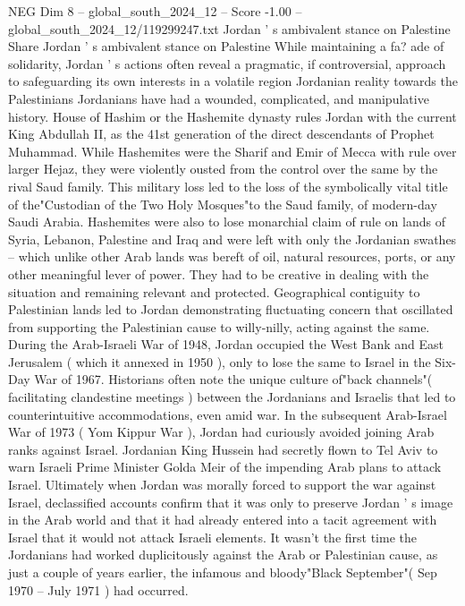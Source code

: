\begin{textsample}{NEG Dim 8 – global\_south\_2024\_12 – Score -1.00 – global\_south\_2024\_12/119299247.txt}  \label{ex:f8_neg_102}
Jordan ' s ambivalent stance on Palestine Share Jordan ' s ambivalent stance on Palestine While maintaining a fa? ade of solidarity, Jordan ' s actions often reveal a pragmatic, if controversial, approach to safeguarding its own interests in a volatile region Jordanian reality towards the Palestinians Jordanians have had a wounded, complicated, and manipulative history.
House of Hashim or the Hashemite dynasty rules Jordan with the current King Abdullah II, as the 41st generation of the direct descendants of Prophet Muhammad.
While Hashemites were the Sharif and Emir of Mecca with rule over larger Hejaz, they were violently ousted from the control over the same by the rival Saud family.
This military loss led to the loss of the symbolically vital title of the"Custodian of the Two Holy Mosques"to the Saud family, of modern-day Saudi Arabia.
Hashemites were also to lose monarchial claim of rule on lands of Syria, Lebanon, Palestine and Iraq and were left with only the Jordanian swathes -- which unlike other Arab lands was bereft of oil, natural resources, ports, or any other meaningful lever of power.
They had to be creative in dealing with the situation and remaining relevant and protected.
Geographical contiguity to Palestinian lands led to Jordan demonstrating fluctuating concern that oscillated from supporting the Palestinian cause to willy-nilly, acting against the same.
During the Arab-Israeli War of 1948, Jordan occupied the West Bank and East Jerusalem ( which it annexed in 1950 ), only to lose the same to Israel in the Six-Day War of 1967.
Historians often note the unique culture of"back channels"( facilitating clandestine meetings ) between the Jordanians and Israelis that led to counterintuitive accommodations, even amid war.
In the subsequent Arab-Israel War of 1973 ( Yom Kippur War ), Jordan had curiously avoided joining Arab ranks against Israel.
Jordanian King Hussein had secretly flown to Tel Aviv to warn Israeli Prime Minister Golda Meir of the impending Arab plans to attack Israel.
Ultimately when Jordan was morally forced to support the war against Israel, declassified accounts confirm that it was only to preserve Jordan ' s image in the Arab world and that it had already entered into a tacit agreement with Israel that it would not attack Israeli elements.
It wasn't the first time the Jordanians had worked duplicitously against the Arab or Palestinian cause, as just a couple of years earlier, the infamous and bloody"Black September"( Sep 1970 -- July 1971 ) had occurred.

\end{textsample}
